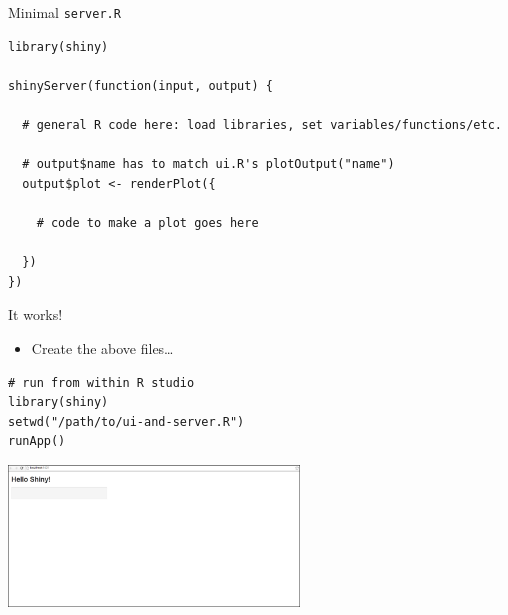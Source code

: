 \documentclass[sans,aspectratio=169,presentation,bigger,fleqn]{beamer}
\begin{document}
\begin{frame}[fragile,label=sec-7]{Minimal \texttt{server.R}}
 \scriptsize
\begin{verbatim}
library(shiny)

shinyServer(function(input, output) {

  # general R code here: load libraries, set variables/functions/etc.

  # output$name has to match ui.R's plotOutput("name")
  output$plot <- renderPlot({

    # code to make a plot goes here

  })
})
\end{verbatim}
\scriptsize
\end{frame}

\begin{frame}[fragile,label=sec-8]{It works!}
 \begin{itemize}
\item Create the above files\ldots{}
\end{itemize}

\scriptsize
\begin{verbatim}
# run from within R studio
library(shiny)
setwd("/path/to/ui-and-server.R")
runApp()
\end{verbatim}

\begin{center}
\includegraphics[height=3.75cm]{./img/shiny-template.png}
\end{center}
\end{frame}
\end{document}
